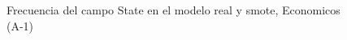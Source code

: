 \begin{figure}[H]
    \centering
    
    \caption{Frecuencia del campo State en el modelo real y smote, Economicos (A-1)}
    \label{frecuency-State-smote-enc}
\end{figure}